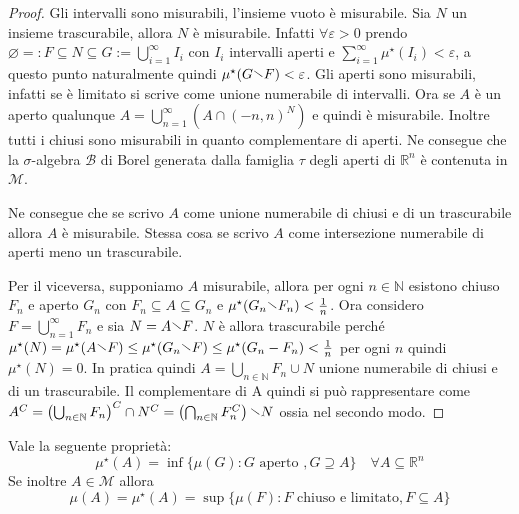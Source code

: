 \begin{proof}
    Gli intervalli sono misurabili, l'insieme vuoto è misurabile.
    Sia \(N\) un insieme trascurabile, allora \(N\) è misurabile. Infatti
    \(\forall \varepsilon >0\) prendo \(\varnothing =: F \subseteq N \subseteq G
    := \bigcup_{i=1}^{\infty} I_{i} \) con \(I_{i}\) intervalli aperti e
    \(\sum_{i=1}^{\infty} \mu^\star(I_{i}) < \varepsilon \), a questo punto
    naturalmente quindi \(\mu^\star(G \sminus F) < \varepsilon\).
    Gli aperti sono misurabili, infatti se è limitato si scrive come unione
    numerabile di intervalli. Ora se \(A\) è un aperto qualunque \(A =
    \bigcup_{n=1}^{\infty} \left( A \cap {(-n, n)}^{N} \right)\) e quindi è
    misurabile. Inoltre tutti i chiusi sono misurabili in quanto complementare
    di aperti. Ne consegue che la \(\sigma\)-algebra \(\mathcal{B}\) di Borel
    generata dalla famiglia \(\tau\) degli aperti di \(\mathbb{R}^{n}\) è
    contenuta in \(\mathcal{M}\).

    Ne consegue che se scrivo \(A\) come unione numerabile di chiusi e di un
    trascurabile allora \(A\) è misurabile. Stessa cosa se scrivo \(A\) come
    intersezione numerabile di aperti meno un trascurabile.

    Per il viceversa, supponiamo \(A\) misurabile, allora per ogni \(n \in
    \mathbb{N}\) esistono chiuso \(F_{n}\) e aperto \(G_{n}\) con \(F_{n}
    \subseteq A \subseteq G_{n}  \) e \(\mu^\star(G_{n} \sminus F_{n}) <
    \frac{1}{n}\). Ora considero \(F = \bigcup_{n=1}^{\infty}F_{n}\) e sia \(N =
    A \sminus F\). \(N\) è allora trascurabile perché \(\mu^\star(N) =
    \mu^\star(A \sminus F) \le \mu^\star(G_{n} \sminus F) \le \mu^\star(G_{n} -
    F_{n}) < \frac{1}{n}\) per ogni \(n\) quindi \(\mu^\star(N) = 0\). In
    pratica quindi \(A = \bigcup_{n \in \mathbb{N}} F_{n}  \cup N\) unione
    numerabile di chiusi e di un trascurabile. Il complementare di A quindi si
può rappresentare come \(A^{C} = {\left(\bigcup_{n \in \mathbb{N}} F_{n} \right)}^{C} \cap
N^{C} = \left(\bigcap_{n \in \mathbb{N}} F_{n}^{C}\right) \sminus N\) ossia nel
secondo modo.
\end{proof}
\begin{proposition}\label{prop:prop_6}
    Vale la seguente proprietà:
    \[
        \mu^\star(A) = \inf \{\mu(G) : G \text{ aperto }, G \supseteq A \} \quad
        \forall A \subseteq \mathbb{R}^{n} 
    \]
    Se inoltre \(A \in \mathcal{M}\) allora 
    \[
        \mu(A) = \mu^\star(A) = \sup \{\mu(F) : F \text{ chiuso e limitato}, F
        \subseteq A \} 
    \]
\end{proposition}
